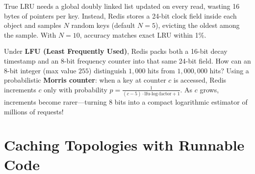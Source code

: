 \begin{underthehoodbox}
True LRU needs a global doubly linked list updated on every read, wasting 16 bytes of pointers per key. Instead, Redis stores a 24-bit clock field inside each object and samples $N$ random keys (default $N=5$), evicting the oldest among the sample. With $N=10$, accuracy matches exact LRU within 1\%.

Under \textbf{LFU (Least Frequently Used)}, Redis packs both a 16-bit decay timestamp and an 8-bit frequency counter into that same 24-bit field. How can an 8-bit integer (max value $255$) distinguish $1{,}000$ hits from $1{,}000{,}000$ hits? Using a probabilistic \textbf{Morris counter}: when a key at counter $c$ is accessed, Redis increments $c$ only with probability $p = \frac{1}{(c - 5) \cdot \text{lfu-log-factor} + 1}$. As $c$ grows, increments become rarer---turning 8 bits into a compact logarithmic estimator of millions of requests!
\end{underthehoodbox}

\section{Caching Topologies with Runnable Code}

